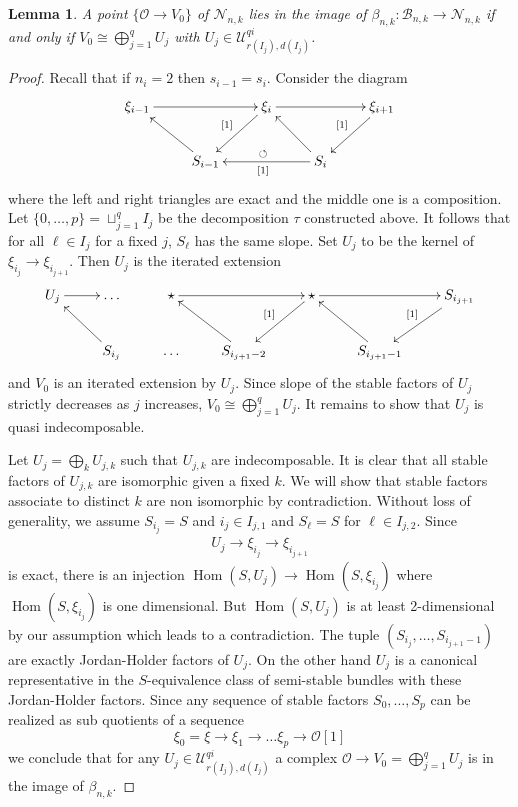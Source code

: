 \documentclass[reqno]{amsart}
\newtheorem{lemma}[theorem]{Lemma}
\theoremstyle{definition}
\theoremstyle{remark}
\newcommand{\Hom}{\operatorname{Hom}}
\newcommand{\cU}{\mathcal{U}}
\newcommand{\cO}{\mathcal{O}}
\newcommand{\sB}{\mathscr{B}}
\newcommand{\sN}{\mathscr{N}}
\numberwithin{equation}{section}
\begin{document}
\begin{lemma}\label{lem:V0}
A point $\{\cO\to V_0\}$ of $\sN_{n,k}$ lies in the image of $\beta_{n,k}: \sB_{n,k}\to \sN_{n,k}$ if and only if $V_0\cong \bigoplus_{j=1}^q U_j$ with $U_j\in \cU^{qi}_{r(I_j),d(I_j)}$. 
\end{lemma}
\begin{proof}
Recall that if $n_i=2$ then $s_{i-1}=s_i$. Consider the diagram
\[
\xymatrix{
\xi_{i-1}\ar[rr] & &\xi_i \ar[ld]_{[1]}\ar[rr] && \xi_{i+1}\ar[ld]_{[1]}\\
& S_{i-1}\ar[lu] && S_i\ar[lu]\ar[ll]^{[1]}_{\circlearrowleft}
}
\] where the left and right triangles are exact  and the middle one is a composition. Let $\{0,\ldots,p\}=\sqcup_{j=1}^q I_j$ be the decomposition $\tau$  constructed above. It follows that for all $
\ell\in I_j$ for a fixed $j$, $S_\ell$ has the same slope. Set $U_j$ to be the kernel of $\xi_{i_j}\to \xi_{i_{j+1}}$. Then $U_j$ is the iterated extension
\[
\xymatrix{
U_j\ar[r]  & \ldots & \star\ar[rr] && \star\ar[ld]_{[1]}\ar[rr] && S_{i_{j+1}}\ar[ld]_{[1]}\\
&  S_{i_{j}}\ar[ul] & \ldots &  S_{i_{j+1}-2}\ar[ul] & &  S_{i_{j+1}-1}\ar[ul]
}
\] and $V_0$ is an iterated extension by $U_j$. Since slope of the stable factors of $U_j$ strictly decreases as $j$ increases, $V_0\cong \bigoplus_{j=1}^q U_j$. It remains to show that $U_j$ is quasi indecomposable.

Let  $U_j=\bigoplus_{k} U_{j,k}$ such that $U_{j,k}$ are indecomposable. It is clear that all stable factors of $U_{j,k}$ are isomorphic given a fixed $k$. We will show that stable factors associate to distinct $k$ are non isomorphic by contradiction. Without loss of generality, we assume $S_{i_j}=S$ and $i_j\in I_{j,1}$ and $S_\ell=S$ for $\ell\in I_{j,2}$.  Since
\begin{align}
U_j\to \xi_{i_j}\to \xi_{i_{j+1}}
\end{align} is exact, 
there is an injection $\Hom(S, U_j)\to \Hom(S,\xi_{i_j})$ where $\Hom(S,\xi_{i_j})$ is one dimensional. But $\Hom(S, U_j)$ is at least 2-dimensional by our assumption which leads to a contradiction.
The tuple $(S_{i_j},\ldots,S_{i_{j+1}-1})$ are exactly Jordan-Holder factors of $U_j$. On the other hand $U_j$ is a canonical representative in the $S$-equivalence class of semi-stable bundles with these Jordan-Holder factors. Since any sequence of stable factors $S_0,\ldots,S_p$ can be realized as sub quotients of a sequence
\[
\xi_0=\xi\to \xi_1\to\ldots\xi_p\to\cO[1]
\] we conclude that for any $U_j\in \cU^{qi}_{r(I_j),d(I_j)}$ a complex $\cO\to V_0=\bigoplus_{j=1}^q U_j$ is in the image of $\beta_{n,k}$.

\end{proof}
\end{document}
